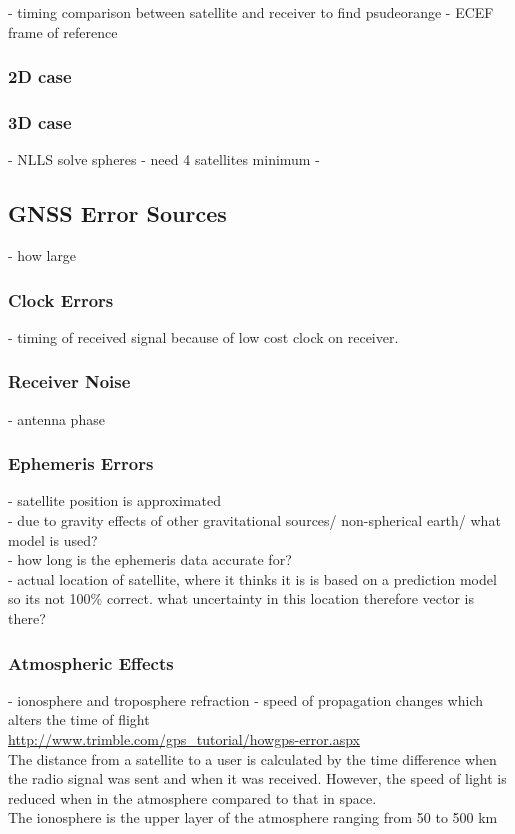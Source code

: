 \documentclass[11pt,a4paper]{article}
\begin{document}
- timing comparison between satellite and receiver to find psudeorange
- ECEF frame of reference
\subsubsection{2D case}
\subsubsection{3D case}
- NLLS solve spheres
- need 4 satellites minimum
- 


\subsection{GNSS Error Sources}
- how large
\subsubsection{Clock Errors}
- timing of received signal because of low cost clock on receiver. 
\subsubsection{Receiver Noise}
- antenna phase
\subsubsection{Ephemeris Errors}
- satellite position is approximated\\
- due to gravity effects of other gravitational sources/ non-spherical earth/ what model is used?\\
- how long is the ephemeris data accurate for?\\
- actual location of satellite, where it thinks it is is based on a prediction model so its not 100\% correct. what uncertainty in this location therefore vector is there?

\subsubsection{Atmospheric Effects}
- ionosphere and troposphere refraction - speed of propagation changes which alters the time of flight\\
\url{http://www.trimble.com/gps_tutorial/howgps-error.aspx} \\
The distance from a satellite to a user is calculated by the time difference when the radio signal was sent and when it was received. However, the speed of light is reduced when in the atmosphere compared to that in space.\\
The ionosphere is the upper layer of the atmosphere ranging from 50 to 500 km
\end{document}
